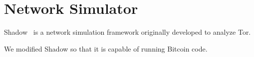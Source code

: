 \section{Network Simulator}

Shadow~\cite{jansen2011shadow} is a network simulation framework originally developed to analyze Tor.

We modified Shadow so that it is capable of running Bitcoin code.
